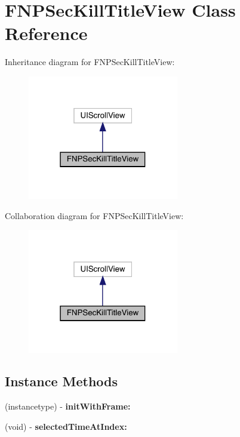 \hypertarget{interface_f_n_p_sec_kill_title_view}{}\section{F\+N\+P\+Sec\+Kill\+Title\+View Class Reference}
\label{interface_f_n_p_sec_kill_title_view}


Inheritance diagram for F\+N\+P\+Sec\+Kill\+Title\+View\+:\nopagebreak
\begin{figure}[H]
\begin{center}
\leavevmode
\includegraphics[width=187pt]{interface_f_n_p_sec_kill_title_view__inherit__graph}
\end{center}
\end{figure}


Collaboration diagram for F\+N\+P\+Sec\+Kill\+Title\+View\+:\nopagebreak
\begin{figure}[H]
\begin{center}
\leavevmode
\includegraphics[width=187pt]{interface_f_n_p_sec_kill_title_view__coll__graph}
\end{center}
\end{figure}
\subsection*{Instance Methods}
\begin{DoxyCompactItemize}
\item 
\mbox{\label{interface_f_n_p_sec_kill_title_view_a5931e51713086822101ed217892cb44f}} 
(instancetype) -\/ {\bfseries init\+With\+Frame\+:}
\item 
\mbox{\label{interface_f_n_p_sec_kill_title_view_ab3db19ffcc839de17e2e2c389772328f}} 
(void) -\/ {\bfseries selected\+Time\+At\+Index\+:}
\end{DoxyCompactItemize}
